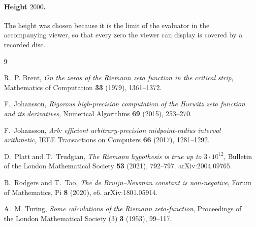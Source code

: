 \documentclass[11pt,a4paper]{article}
\theoremstyle{definition}
\begin{document}
\paragraph{Height $2000$.}
The height was chosen because it is the limit of the evaluator in the
accompanying viewer, so that every zero the viewer can display is covered by
a recorded disc.

\begin{thebibliography}{9}

R.~P. Brent,
\emph{On the zeros of the Riemann zeta function in the critical strip},
Mathematics of Computation \textbf{33} (1979), 1361--1372.

F.~Johansson,
\emph{Rigorous high-precision computation of the Hurwitz zeta function and
its derivatives},
Numerical Algorithms \textbf{69} (2015), 253--270.

F.~Johansson,
\emph{Arb: efficient arbitrary-precision midpoint-radius interval arithmetic},
IEEE Transactions on Computers \textbf{66} (2017), 1281--1292.

D.~Platt and T.~Trudgian,
\emph{The Riemann hypothesis is true up to $3\cdot10^{12}$},
Bulletin of the London Mathematical Society \textbf{53} (2021), 792--797.
arXiv:2004.09765.

B.~Rodgers and T.~Tao,
\emph{The de Bruijn--Newman constant is non-negative},
Forum of Mathematics, Pi \textbf{8} (2020), e6.
arXiv:1801.05914.

A.~M. Turing,
\emph{Some calculations of the Riemann zeta-function},
Proceedings of the London Mathematical Society (3) \textbf{3} (1953), 99--117.

\end{thebibliography}
\end{document}
